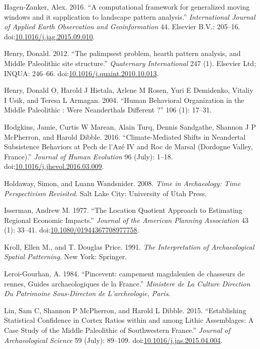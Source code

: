 \documentclass[smallextended]{svjour3}       %
\begin{document}
\hypertarget{ref-Hagen-Zanker2016}{}
Hagen-Zanker, Alex. 2016. ``A computational framework for generalized
moving windows and it sapplication to landscape pattern analysis.''
\emph{International Journal of Applied Earth Observation and
Geoinformation} 44. Elsevier B.V.: 205--16.
doi:\href{https://doi.org/10.1016/j.jag.2015.09.010}{10.1016/j.jag.2015.09.010}.

\hypertarget{ref-Henry2012}{}
Henry, Donald. 2012. ``The palimpsest problem, hearth pattern analysis,
and Middle Paleolithic site structure.'' \emph{Quaternary International}
247 (1). Elsevier Ltd; INQUA: 246--66.
doi:\href{https://doi.org/10.1016/j.quaint.2010.10.013}{10.1016/j.quaint.2010.10.013}.

\hypertarget{ref-Henry2004}{}
Henry, Donald O, Harold J Hietala, Arlene M Rosen, Yuri E Demidenko,
Vitaliy I Usik, and Teresa L Armagan. 2004. ``Human Behavioral
Organization in the Middle Paleolithic : Were Neanderthals Different ?''
106 (1): 17--31.

\hypertarget{ref-hodgkins_climate-mediated_2016}{}
Hodgkins, Jamie, Curtis W Marean, Alain Turq, Dennis Sandgathe, Shannon
J P McPherron, and Harold Dibble. 2016. ``Climate-Mediated Shifts in
Neandertal Subsistence Behaviors at Pech de l'Azé IV and Roc de Marsal
(Dordogne Valley, France).'' \emph{Journal of Human Evolution} 96
(July): 1--18.
doi:\href{https://doi.org/10.1016/j.jhevol.2016.03.009}{10.1016/j.jhevol.2016.03.009}.

\hypertarget{ref-Holdaway2008}{}
Holdaway, Simon, and Luann Wandsnider. 2008. \emph{Time in Archaeology:
Time Perspectivism Revisited}. Salt Lake City: University of Utah Press.

\hypertarget{ref-Isserman1977a}{}
Isserman, Andrew M. 1977. ``The Location Quotient Approach to Estimating
Regional Economic Impacts.'' \emph{Journal of the American Planning
Association} 43 (1): 33--41.
doi:\href{https://doi.org/10.1080/01944367708977758}{10.1080/01944367708977758}.

\hypertarget{ref-Kroll1991}{}
Kroll, Ellen M., and T. Douglas Price. 1991. \emph{The Interpretation of
Archaeological Spatial Patterning}. New York: Springer.

\hypertarget{ref-Leroi-Gourhan1984}{}
Leroi-Gourhan, A. 1984. ``Pincevent: campement magdalenien de chasseurs
de rennes, Guides archaeologiques de la France.'' \emph{Ministere de La
Culture Direction Du Patrimoine Sous-Directon de L'archeologie, Paris}.

\hypertarget{ref-lin_establishing_2015}{}
Lin, Sam C, Shannon P McPherron, and Harold L Dibble. 2015.
``Establishing Statistical Confidence in Cortex Ratios within and among
Lithic Assemblages: A Case Study of the Middle Paleolithic of
Southwestern France.'' \emph{Journal of Archaeological Science} 59
(July): 89--109.
doi:\href{https://doi.org/10.1016/j.jas.2015.04.004}{10.1016/j.jas.2015.04.004}.
\end{document}
